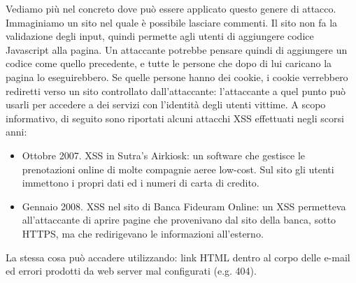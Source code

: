 Vediamo più nel concreto dove può essere applicato questo genere di attacco. Immaginiamo un sito nel quale è possibile lasciare commenti. Il sito non fa la validazione degli input, quindi permette agli utenti di aggiungere codice Javascript alla pagina. Un attaccante potrebbe pensare quindi di aggiungere un codice come quello precedente, e tutte le persone che dopo di lui caricano la pagina lo eseguirebbero. Se quelle persone hanno dei cookie, i cookie verrebbero rediretti verso un sito controllato dall'attaccante: l'attaccante a quel punto può usarli per accedere a dei servizi con l'identità degli utenti vittime. A scopo informativo, di seguito sono riportati alcuni attacchi XSS effettuati negli scorsi anni:
\begin{itemize}
	\item Ottobre 2007. XSS in Sutra's Airkiosk: un software che gestisce le prenotazioni online di molte compagnie aeree low-cost. Sul sito gli utenti immettono i propri dati ed i numeri di carta di credito.
	\item Gennaio 2008. XSS nel sito di Banca Fideuram Online: un XSS permetteva all'attaccante di aprire pagine che provenivano dal sito della banca, sotto HTTPS, ma che redirigevano le informazioni all'esterno.
\end{itemize}
La stessa cosa può accadere utilizzando: link HTML dentro al corpo delle e-mail ed errori prodotti da web server mal configurati (e.g. 404).

